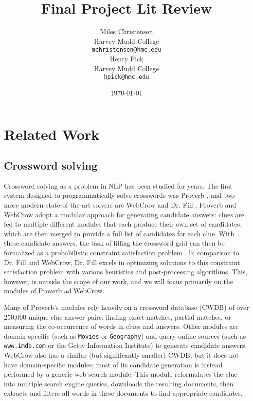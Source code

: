 \documentclass[11pt,a4paper]{article}
\title{Final Project Lit Review}
\author{Miles Christensen \\
  Harvey Mudd College \\
  \texttt{mchristensen@hmc.edu} \\\And
  Henry Pick \\
  Harvey Mudd College \\
  \texttt{hpick@hmc.edu} \\}
\date{\today}
\begin{document}
\maketitle

\section{Related Work}

\subsection{Crossword solving}

Crossword solving as a problem in NLP has been studied for years. The first system designed to programmatically solve crosswords was Proverb \cite{Keim99-PROVERB, Littman02-AProbabilistic}, and two more modern state-of-the-art solvers are WebCrow \cite{Angelini05-Webcrow} and Dr. Fill \cite{Ginsberg11-DrFill}. Proverb and WebCrow adopt a modular approach for generating candidate answers: clues are fed to multiple different modules that each produce their own set of candidates, which are then merged to provide a full list of candidates for each clue. With these candidate answers, the task of filling the crossword grid can then be formalized as a probabilistic constraint satisfaction problem \cite{Shazeer99-Solving}. In comparison to Dr. Fill and WebCrow, Dr. Fill excels in optimizing solutions to this constraint satisfaction problem with various heuristics and post-processing algorithms. This, however, is outside the scope of our work, and we will focus primarily on the modules of Proverb ad WebCrow.

Many of Proverb's modules rely heavily on a crossword database (CWDB) of over 250,000 unique clue-answer pairs, finding exact matches, partial matches, or measuring the co-occurrence of words in clues and answers. Other modules are domain-specific (such as \verb.Movies. or \verb.Geography.) and query online sources (such as \verb,www.imdb.com, or the Getty Information Institute) to generate candidate answers. WebCrow also has a similar (but significantly smaller) CWDB, but it does not have domain-specific modules; most of its candidate generation is instead performed by a generic web search module. This module reformulates the clue into multiple search engine queries, downloads the resulting documents, then extracts and filters all words in these documents to find appropriate candidates.
\end{document}
